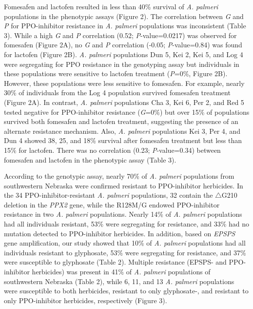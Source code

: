 \documentclass[10pt,letterpaper]{article}
\begin{document}
Fomesafen and lactofen resulted in less than 40\% survival of \emph{A.
palmeri} populations in the phenotypic assays (Figure 2). The
correlation between \emph{G} and \emph{P} for PPO-inhibitor resistance
in \emph{A. palmeri} populations was inconsistent (Table 3). While a
high \emph{G} and \emph{P} correlation (0.52; \emph{P}-value=0.0217) was
observed for fomesafen (Figure 2A), no \emph{G} and \emph{P} correlation
(-0.05; \emph{P}-value=0.84) was found for lactofen (Figure 2B).
\emph{A. palmeri} populations Dun 5, Kei 2, Kei 5, and Log 4 were
segregating for PPO resistance in the genotyping assay but individuals
in these populations were sensitive to lactofen treatment (\emph{P}=0\%,
Figure 2B). However, these populations were less sensitive to fomesafen.
For example, nearly 30\% of individuals from the Log 4 population
survived fomesafen treatment (Figure 2A). In contrast, \emph{A. palmeri}
populations Cha 3, Kei 6, Per 2, and Red 5 tested negative for
PPO-inhibitor resistance (\emph{G}=0\%) but over 15\% of populations
survived both fomesafen and lactofen treatment, suggesting the presence
of an alternate resistance mechanism. Also, \emph{A. palmeri}
populations Kei 3, Per 4, and Dun 4 showed 38, 25, and 18\% survival
after fomesafen treatment but less than 15\% for lactofen. There was no
correlation (0.23; \emph{P}-value=0.34) between fomesafen and lactofen
in the phenotypic assay (Table 3).

According to the genotypic assay, nearly 70\% of \emph{A. palmeri}
populations from southwestern Nebraska were confirmed resistant to
PPO-inhibitor herbicides. In the 34 PPO-inhibitor-resistant \emph{A.
palmeri} populations, 32 contain the \(\triangle\)G210 deletion in the
\emph{PPX2} gene, while the R128M/G endowed PPO-inhibitor resistance in
two \emph{A. palmeri} populations. Nearly 14\% of \emph{A. palmeri}
populations had all individuals resistant, 53\% were segregating for
resistance, and 33\% had no mutation detected to PPO-inhibitor
herbicides. In addition, based on \emph{EPSPS} gene amplification, our
study showed that 10\% of \emph{A. palmeri} populations had all
individuals resistant to glyphosate, 53\% were segregating for
resistance, and 37\% were susceptible to glyphosate (Table 2). Multiple
resistance (EPSPS- and PPO-inhibitor herbicides) was present in 41\% of
\emph{A. palmeri} populations of southwestern Nebraska (Table 2), while
6, 11, and 13 \emph{A. palmeri} populations were susceptible to both
herbicides, resistant to only glyphosate-, and resistant to only
PPO-inhibitor herbicides, respectively (Figure 3).
\end{document}
